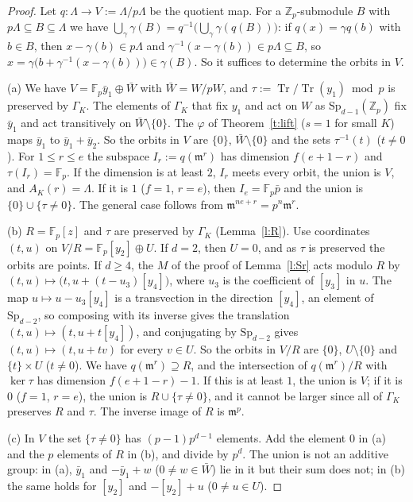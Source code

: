 \documentclass[11pt,a4paper]{article}
\newcommand{\Zp}{\mathbb{Z}_p}
\newcommand{\Fp}{\mathbb{F}_p}
\newcommand{\fm}{\mathfrak{m}}
\newcommand{\Tr}{\operatorname{Tr}}
\newcommand{\Sp}{\mathrm{Sp}}
\newcommand{\yb}{\bar y}
\theoremstyle{plain}
\theoremstyle{definition}
\theoremstyle{remark}
\begin{document}
\begin{proof}
Let $q\colon\Lambda\to V:=\Lambda/p\Lambda$ be the quotient map. For a $\Zp$-submodule $B$ with $p\Lambda\subseteq
B\subseteq\Lambda$ we have $\bigcup_\gamma\gamma(B)=q^{-1}\bigl(\bigcup_\gamma\gamma(q(B))\bigr)$: if $q(x)=\gamma q(b)$
with $b\in B$, then $x-\gamma(b)\in p\Lambda$ and $\gamma^{-1}(x-\gamma(b))\in p\Lambda\subseteq B$, so
$x=\gamma\bigl(b+\gamma^{-1}(x-\gamma(b))\bigr)\in\gamma(B)$. So it suffices to determine the orbits in $V$.

(a) We have $V=\Fp\yb_1\oplus\bar W$ with $\bar W=W/pW$, and $\tau:=\Tr/\Tr(y_1)\bmod p$ is preserved by $\Gamma_K$. The
elements of $\Gamma_K$ that fix $y_1$ and act on $W$ as $\Sp_{d-1}(\Zp)$ \cite[Lemma~3.3]{Kondo26} fix $\yb_1$ and act
transitively on $\bar W\setminus\{0\}$. The $\varphi$ of Theorem~\ref{t:lift} ($s=1$ for small $K$) maps $\yb_1$ to
$\yb_1+\yb_2$. So the orbits in $V$ are $\{0\}$, $\bar W\setminus\{0\}$ and the sets $\tau^{-1}(t)$ ($t\ne0$). For
$1\le r\le e$ the subspace $I_r:=q(\fm^r)$ has dimension $f(e+1-r)$ and $\tau(I_r)=\Fp$. If the dimension is at least
$2$, $I_r$ meets every orbit, the union is $V$, and $A_K(r)=\Lambda$. If it is $1$ ($f=1$, $r=e$), then $I_e=\Fp\bar p$
and the union is $\{0\}\cup\{\tau\ne0\}$. The general case follows from $\fm^{ne+r}=p^n\fm^r$.

(b) $R=\Fp[z]$ and $\tau$ are preserved by $\Gamma_K$ (Lemma~\ref{l:R}). Use coordinates $(t,u)$ on
$V/R=\Fp[y_2]\oplus U$. If $d=2$, then $U=0$, and as $\tau$ is preserved the orbits are points. If $d\ge4$, the $M$ of
the proof of Lemma~\ref{l:Sr} acts modulo $R$ by $(t,u)\mapsto\bigl(t,u+(t-u_3)[y_4]\bigr)$, where $u_3$ is the
coefficient of $[y_3]$ in $u$. The map $u\mapsto u-u_3[y_4]$ is a transvection in the direction $[y_4]$, an element of
$\Sp_{d-2}$, so composing with its inverse gives the translation $(t,u)\mapsto(t,u+t[y_4])$, and conjugating by
$\Sp_{d-2}$ gives $(t,u)\mapsto(t,u+tv)$ for every $v\in U$. So the orbits in $V/R$ are $\{0\}$, $U\setminus\{0\}$ and
$\{t\}\times U$ ($t\ne0$). We have $q(\fm^r)\supseteq R$, and the intersection of $q(\fm^r)/R$ with $\ker\tau$ has
dimension $f(e+1-r)-1$. If this is at least $1$, the union is $V$; if it is $0$ ($f=1$, $r=e$), the union is
$R\cup\{\tau\ne0\}$, and it cannot be larger since all of $\Gamma_K$ preserves $R$ and $\tau$. The inverse image of $R$
is $\fm^p$.

(c) In $V$ the set $\{\tau\ne0\}$ has $(p-1)p^{d-1}$ elements. Add the element $0$ in (a) and the $p$ elements of $R$
in (b), and divide by $p^d$. The union is not an additive group: in (a), $\yb_1$ and $-\yb_1+w$ ($0\ne w\in\bar W$) lie
in it but their sum does not; in (b) the same holds for $[y_2]$ and $-[y_2]+u$ ($0\ne u\in U$).
\end{proof}
\end{document}
